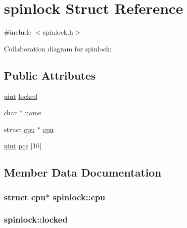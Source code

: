 \hypertarget{structspinlock}{}\section{spinlock Struct Reference}
\label{structspinlock}


{\ttfamily \#include $<$spinlock.\+h$>$}



Collaboration diagram for spinlock\+:
\subsection*{Public Attributes}
\begin{DoxyCompactItemize}
\item 
\hyperlink{custom__types_8h_a91ad9478d81a7aaf2593e8d9c3d06a14}{uint} \hyperlink{structspinlock_a48f3007579f644934d9aba91e5378c03}{locked}
\item 
char $\ast$ \hyperlink{structspinlock_afbec3274bf8ad9c421695a22f8d9d584}{name}
\item 
struct \hyperlink{structcpu}{cpu} $\ast$ \hyperlink{structspinlock_a290ae772c8ccb9e8c1580204c31a7f88}{cpu}
\item 
\hyperlink{custom__types_8h_a91ad9478d81a7aaf2593e8d9c3d06a14}{uint} \hyperlink{structspinlock_ac9ef3f16f664094198af0b9063e23fe0}{pcs} \mbox{[}10\mbox{]}
\end{DoxyCompactItemize}


\subsection{Member Data Documentation}
\subsubsection[{\texorpdfstring{cpu}{cpu}}]{\setlength{\rightskip}{0pt plus 5cm}struct {\bf cpu}$\ast$ spinlock\+::cpu}\hypertarget{structspinlock_a290ae772c8ccb9e8c1580204c31a7f88}{}\label{structspinlock_a290ae772c8ccb9e8c1580204c31a7f88}
\subsubsection[{\texorpdfstring{locked}{locked}}]{ spinlock\+::locked}\hypertarget{structspinlock_a48f3007579f644934d9aba91e5378c03}{}\label{structspinlock_a48f3007579f644934d9aba91e5378c03}
